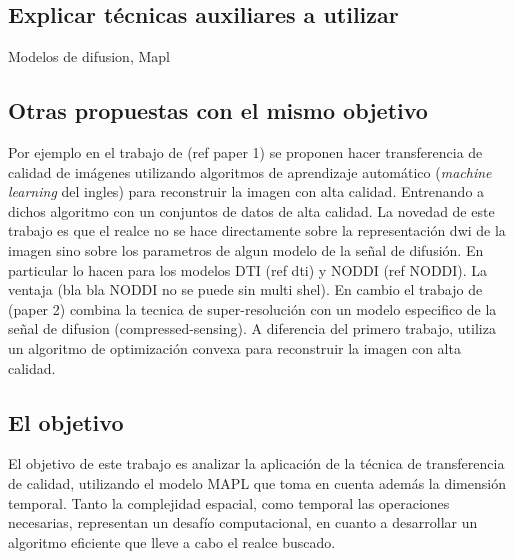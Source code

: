 \documentclass[a4paper,10pt]{article}
\begin{document}
\subsection{Explicar técnicas auxiliares a utilizar}
Modelos de difusion, Mapl 

\subsection{Otras propuestas con el mismo objetivo}
Por ejemplo en el trabajo de (ref paper 1) se proponen hacer transferencia de 
calidad de imágenes utilizando algoritmos de aprendizaje automático 
(\textit{machine learning} del ingles) para reconstruir la imagen con alta 
calidad. Entrenando a dichos algoritmo con un conjuntos de datos de alta 
calidad. La novedad de este trabajo es que el realce no se hace directamente 
sobre la representación dwi de la imagen sino sobre los parametros de algun 
modelo de la señal de difusión. En particular lo hacen para los modelos DTI (ref 
dti) y NODDI (ref NODDI). La ventaja (bla bla NODDI no se puede sin multi 
shel). En cambio el trabajo de (paper 2) combina la tecnica de super-resolución 
con un modelo especifico de la señal de difusion (compressed-sensing). A 
diferencia del primero trabajo, utiliza un algoritmo de optimización convexa 
para reconstruir la imagen con alta calidad.

\subsection{El objetivo}
El objetivo de este trabajo es analizar la aplicación de la técnica de 
transferencia de calidad, utilizando el modelo MAPL que toma en cuenta además 
la dimensión temporal. Tanto la complejidad espacial, como temporal las 
operaciones necesarias, representan un desafío computacional, en cuanto a 
desarrollar un algoritmo eficiente que lleve a cabo el realce buscado.





\clearpage


\end{document}
